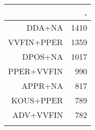 \begin{tabular}{rr}
  \lsptoprule
 & . \\ 
  \midrule
DDA+NA & 1410 \\ 
  VVFIN+PPER & 1359 \\ 
  DPOS+NA & 1017 \\ 
  PPER+VVFIN & 990 \\ 
  APPR+NA & 817 \\ 
  KOUS+PPER & 789 \\ 
  ADV+VVFIN & 782 \\ 
   \lspbottomrule
\end{tabular}
